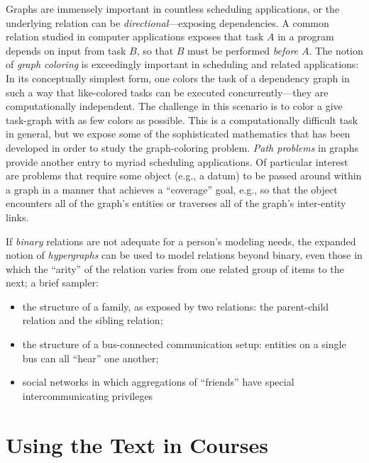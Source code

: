 Graphs are immensely important in countless scheduling applications, or the underlying relation can be {\em directional}---exposing dependencies.  A common relation studied in computer applications exposes that task $A$ in a program depends on input from task $B$, so that $B$ must be performed {\em before $A$}.  The notion of {\it graph coloring} is exceedingly important in scheduling and related applications: In its conceptually simplest form, one colors the task of a dependency graph in such a way that like-colored tasks can be executed concurrently---they are computationally independent.  The challenge in this scenario is to color a give task-graph with as few colors as possible.  This is a computationally difficult task in general, but we expose some of the sophisticated mathematics that has been developed in order to study the graph-coloring problem.  {\em Path problems} in graphs provide another entry to myriad scheduling applications.  Of particular interest are problems that require some object (e.g., a datum) to be passed around within a graph in a manner that achieves a ``coverage'' goal, e.g., so that the object encounters
all of the graph's entities or traverses all of the graph's inter-entity links.

\medskip

If {\em binary} relations are not adequate for a person's modeling needs, the expanded notion of {\em hypergraphs} can be used to model relations beyond binary, even those in which the ``arity'' of the relation varies from one related group of items to the next; a brief sampler:
\begin{itemize}
\item
the structure of a family, as exposed by two relations: the parent-child relation and the sibling relation;
\item
the structure of a bus-connected communication setup: entities on a single bus can all ``hear'' one another;
\item
social networks in which aggregations of ``friends'' have special intercommunicating privileges
\end{itemize}


\section{Using the Text in Courses}
\label{sec:how-to-use}


